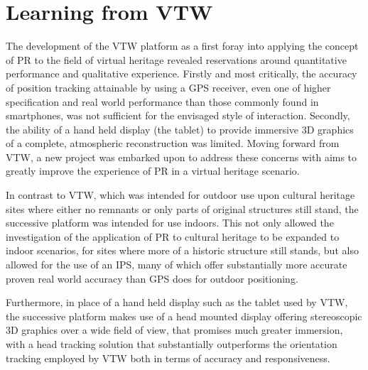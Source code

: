 

\section{Learning from VTW}
The development of the VTW platform as a first foray into applying the concept of PR to the field of virtual heritage revealed reservations around quantitative performance and qualitative experience. Firstly and most critically, the accuracy of position tracking attainable by using a GPS receiver, even one of higher specification and real world performance than those commonly found in smartphones, was not sufficient for the envisaged style of interaction. Secondly, the ability of a hand held  display (the tablet) to provide immersive 3D graphics of a complete, atmospheric reconstruction was limited. Moving forward from VTW, a new project was embarked upon to address these concerns with aims to greatly improve the experience of PR in a virtual heritage scenario.

In contrast to VTW, which was intended for outdoor use upon cultural heritage sites where either no remnants or only parts of original structures still stand, the successive platform was intended for use indoors. This not only allowed the investigation of the application of PR to cultural heritage to be expanded to indoor scenarios, for sites where more of a historic structure still stands, but also allowed for the use of an IPS, many of which offer substantially more accurate proven real world accuracy than GPS does for outdoor positioning.

Furthermore, in place of a hand held display such as the tablet used by VTW, the successive platform makes use of a head mounted display offering stereoscopic 3D graphics over a wide field of view, that promises much greater immersion, with a head tracking solution that substantially outperforms the orientation tracking employed by VTW both in terms of accuracy and responsiveness.


